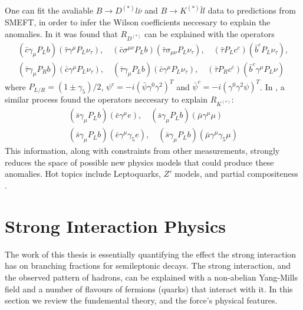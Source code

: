 One can fit the avaliable $B\to D^{(*)}l\bar{\nu}$ and $B\to K^{(*)}\bar{l}l$ data to predictions from SMEFT, in order to infer the Wilson coefficients neccesary to explain the anomalies. In \cite{Freytsis:2015qca} it was found that $R_{D^{(*)}}$ can be explained with the operators
\begin{gather}
  \nonumber
  (\bar{c}\gamma_{\mu}P_L b)(\bar{\tau}\gamma^{\mu} P_L \nu_{\tau}), \quad
  (\bar{c}\sigma^{\mu\nu} P_L b)(\bar{\tau} \sigma_{\mu\nu} P_L \nu_{\tau}), \quad
  (\bar{\tau} P_L c^c)(\bar{b}^c P_L \nu_{\tau}), \\
  (\bar{\tau}\gamma_{\mu} P_R b) (\bar{c} \gamma^{\mu} P_L \nu_{\tau}), \quad
  (\bar{\tau}\gamma_{\mu}P_L b)(\bar{c}\gamma^{\mu} P_L \nu_{\tau}), \quad
  (\bar{\tau}P_R c^c)(\bar{b}^c \gamma^{\mu} P_L \nu)
\end{gather}
where $P_{L/R} = (1\pm \gamma_5)/2$, $\psi^c = -i(\bar{\psi}\gamma^0\gamma^2)^T$ and $\bar{\psi}^c = -i(\gamma^0\gamma^2 \psi)^T$. In \cite{Altmannshofer:2017yso}, a similar process found the operators neccesary to explain $R_{K^{(*)}}$:
\begin{gather}
  \nonumber
  (\bar{s}\gamma_{\mu}P_L b)(\bar{e}\gamma^{\mu}e), \quad (\bar{s}\gamma_{\mu}P_L b)(\bar{\mu}\gamma^{\mu}\mu) \\
   (\bar{s}\gamma_{\mu}P_L b)(\bar{e}\gamma^{\mu}\gamma_5e), \quad (\bar{s}\gamma_{\mu}P_L b)(\bar{\mu}\gamma^{\mu}\gamma_5\mu)
\end{gather}
This information, along with constraints from other measurements, strongly reduces the space of possible new physics models that could produce these anomalies. Hot topics include Leptoquarks, $Z'$ models, and partial compositeness \cite{Altmannshofer:2017yso,Freytsis:2015qca,Bauer:2015knc,Crivellin:2015mga}.




\section{Strong Interaction Physics}
\label{sec:stronginteractions}

The work of this thesis is essentially quantifying the effect the strong interaction has on branching fractions for semileptonic decays. The strong interaction, and the observed pattern of hadrons, can be explained with a non-abelian Yang-Mills field and a number of flavours of fermions (quarks) that interact with it. In this section we review the fundemental theory, and the force's physical features.

